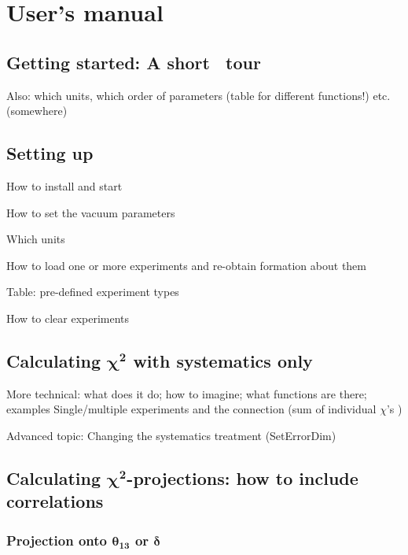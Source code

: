 
\part{User's manual}
\chapter{Getting started: A short \GLOBES\ tour}

Also: which units, which order of parameters (table for different functions!) etc. (somewhere)

\chapter{Setting up \GLOBES }

\bi
\item
 How to install and start \GLOBES
\item
 How to set the vacuum parameters 
\item
 Which units
\item
 How to load one or more experiments and re-obtain formation about them
\item
Table: pre-defined experiment types
\item
 How to clear experiments
\ei

\chapter[Calculating $\chi^2$ with systematics only]{Calculating $\boldsymbol{\chi^2}$ with systematics only}

\bi
\item
 More technical: what does it do; how to imagine; what functions are there; examples
 Single/multiple experiments and the connection (sum of individual $\chi$'s )
\item
 Advanced topic: Changing the systematics treatment (SetErrorDim)
\ei

\chapter[Calculating $\chi^2$-projections: how to include correlations]{Calculating $\boldsymbol{\chi^2}$-projections: how to include correlations}

\section[Projection onto $\theta_{13}$ or $\delta$]{Projection onto $\boldsymbol{\theta_{13}}$ or $\boldsymbol{\delta}$}

